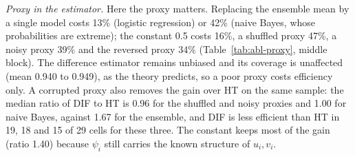 \documentclass[pdflatex,sn-mathphys-num,iicol]{sn-jnl}
\theoremstyle{thmstyleone}
\theoremstyle{thmstyletwo}
\theoremstyle{thmstylethree}
\begin{document}
\emph{Proxy in the estimator.} Here the proxy matters. Replacing the ensemble mean by a single model costs 13\% (logistic regression) or 42\% (naive Bayes, whose probabilities are extreme); the constant 0.5 costs 16\%, a shuffled proxy 47\%, a noisy proxy 39\% and the reversed proxy 34\% (Table~\ref{tab:abl-proxy}, middle block). The difference estimator remains unbiased and its coverage is unaffected (mean 0.940 to 0.949), as the theory predicts, so a poor proxy costs efficiency only. A corrupted proxy also removes the gain over HT on the same sample: the median ratio of DIF to HT is 0.96 for the shuffled and noisy proxies and 1.00 for naive Bayes, against 1.67 for the ensemble, and DIF is less efficient than HT in 19, 18 and 15 of 29 cells for these three. The constant keeps most of the gain (ratio 1.40) because $\psi_i$ still carries the known structure of $u_i,v_i$.
\end{document}
